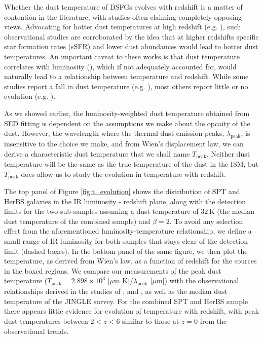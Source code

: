 Whether the dust temperature of DSFGs evolves with redshift is a matter of contention in the literature, with studies often claiming completely opposing views. Advocating for hotter dust temperatures at high redshift (e.g. \citealt{Magdis_2012, Magnelli_2014, Swinbank_2014, Bethermin_2015, Faisst_2017, Schreiber_2018, Zavala_2018b, Liang_2019, Ma_2019, Faisst_2020, Bakx_2021, Witstok_2023}), such observational studies are corroborated by the idea that at higher redshifts specific star formation rates (sSFR) and lower dust abundances would lead to hotter dust temperatures. An important caveat to these works is that dust temperature correlates with luminosity (\citealt{Dunne_2000}), which if not adequately accounted for, would naturally lead to a relationship between temperature and redshift. While some studies report a fall in dust temperature (e.g. \citealt{Symeonidis_2013}), most others report little or no evolution (e.g. \citealt{Casey_2018, Jin_2019, Lim_2020a, Dudzeviciute_2020, Reuter_2020, Barger_2022, Drew_2022, Witstok_2023}).

As we showed earlier, the luminosity-weighted dust temperature obtained from SED fitting is dependent on the assumptions we make about the opcaity of the dust. However, the wavelength where the thermal dust emission peaks, $\lambda_\textrm{peak}$, is insensitive to the choice we make, and from Wien's displacement law, we can derive a characteristic dust temperature that we shall name $T_\textrm{peak}$. Neither dust temperature will be the same as the true temperature of the dust in the ISM, but $T_\textrm{peak}$ does allow us to study the evolution in temperature with redshift. 

The top panel of Figure \ref{fig:t_evolution} shows the distribution of SPT and HerBS galaxies in the IR luminosity - redshift plane, along with the detection limits for the two sub-samples assuming a dust temperature of $32\,$K (the median dust temperature of the combined sample) and $\beta = 2$. To avoid any selection effect from the aforementioned luminosity-temperature relationship, we define a small range of IR luminosity for both samples that stays clear of the detection limit (dashed boxes). In the bottom panel of the same figure, we then plot the temperature, as derived from Wien's law, as a function of redshift for the sources in the boxed regions. We compare our measurements of the peak dust temperature ($T_{\textrm{peak}} = 2.898 \times 10^3$ [$\mu$m K]/$\lambda_{\textrm{peak}}$ [$\mu$m]) with the observational relationships derived in the studies of \citealt{Schreiber_2018}, \citealt{Bouwens_2020} and \citealt{Viero_2022}, as well as the median dust temperature of the JINGLE survey. For the combined SPT and HerBS sample there appears little evidence for evolution of temperature with redshift, with peak dust temperatures between $2 < z < 6$ similar to those at $z = 0$ from the observational trends.

